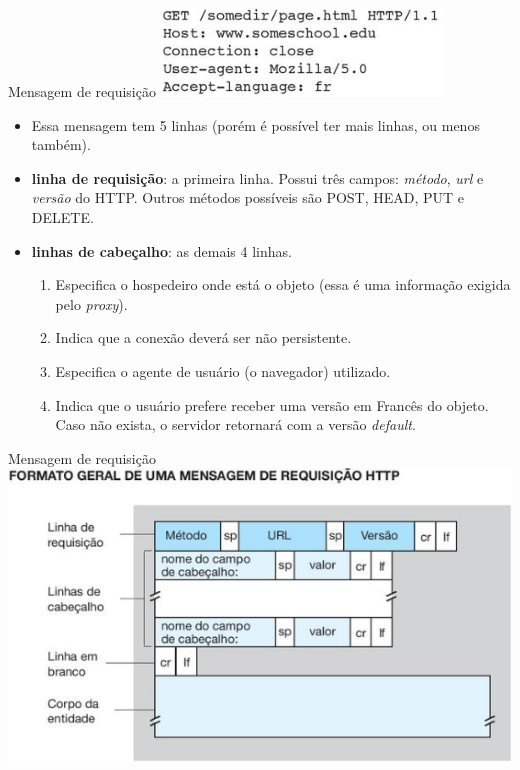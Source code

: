 \documentclass{libs/ufc_format}
\begin{document}
\begin{frame}{Mensagem de requisição}
    \centering
    \includegraphics[scale=0.7]{figuras/figura04_03}
    \begin{itemize}
        \justifying
        \item Essa mensagem tem 5 linhas (porém é possível ter mais linhas, ou menos também).
        \item \textbf{linha de requisição}: a primeira linha. Possui três campos: \textit{método}, \textit{url} e \textit{versão} do HTTP. Outros métodos possíveis são POST, HEAD, PUT e DELETE.
        \item \textbf{linhas de cabeçalho}: as demais 4 linhas.
            \begin{enumerate}
                \justifying
                \item Especifica o hospedeiro onde está o objeto (essa é uma informação exigida pelo \textit{proxy}).
                \item Indica que a conexão deverá ser não persistente.
                \item Especifica o agente de usuário (o navegador) utilizado.
                \item Indica que o usuário prefere receber uma versão em Francês do objeto. Caso não exista, o servidor retornará com a versão \textit{default}.
            \end{enumerate}
    \end{itemize}
\end{frame}

\begin{frame}{Mensagem de requisição}
    \includegraphics[scale=0.7]{figuras/figura04_04}
\end{frame}
\end{document}

